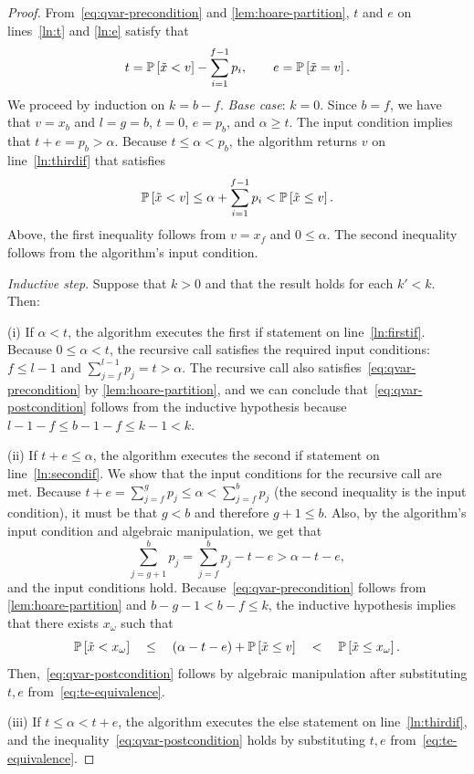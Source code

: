 \begin{proof}
From~\eqref{eq:qvar-precondition} and \cref{lem:hoare-partition}, $t$ and $e$ on lines~\ref{ln:t} and \ref{ln:e} satisfy that
\begin{equation} \label{eq:te-equivalence}
  t = \P{\tilde{x} < v} - \sum_{i=1}^{f-1} p_i , \qquad e = \P{\tilde{x} = v}.
\end{equation}
We proceed by induction on $k = b - f$. \emph{Base case}: $k = 0$. Since $b = f$, we have that $v = x_b$ and $l = g = b$, $t = 0$, $e = p_b$, and $\alpha  \ge t$. The input condition implies that $t + e = p_b > \alpha$. Because $t \le \alpha < p_b$, the algorithm returns $v$ on line~\ref{ln:thirdif} that satisfies
\[
 \P{\tilde{x} < v} \le \alpha + \sum_{i=1}^{f-1} p_i < \P{\tilde{x} \le v}. 
\]
Above, the first inequality follows from $v = x_f$ and $0 \le \alpha$. The second inequality follows from the algorithm's input condition.  

\emph{Inductive step}. Suppose that $k>0$ and that the result holds for each $k' < k$. Then:

(i) If $\alpha < t$, the algorithm executes the first if statement on line~\ref{ln:firstif}. Because $0 \le \alpha  < t$, the recursive call satisfies the required input conditions: $f \le l-1$ and $\sum_{j=f}^{l-1} p_j = t > \alpha$. The recursive call also satisfies~\eqref{eq:qvar-precondition} by \cref{lem:hoare-partition}, and we can conclude that~\eqref{eq:qvar-postcondition} follows from the inductive hypothesis because $l-1 - f \le b-1 -f \le k-1 < k$. 

(ii) If $t + e \le \alpha$, the algorithm executes the second if statement on line~\ref{ln:secondif}. We show that the input conditions for the recursive call are met. Because $t + e = \sum_{j = f}^g p_j \le \alpha < \sum_{j=f}^b p_j$  (the second inequality is the input condition), it must be that $g < b$ and therefore $g+1 \le b$. Also, by the algorithm's input condition and algebraic manipulation, we get that
\[
 \sum_{j=g+1}^b p_j = \sum_{j=f}^b p_j - t - e > \alpha - t - e,
\]
and the input conditions hold.  Because~\eqref{eq:qvar-precondition} follows from \cref{lem:hoare-partition} and $b - g - 1 < b-f \le  k$, the inductive hypothesis implies that there exists $x_{\omega}$ such that
\[
  \P{\tilde{x} < x_{\omega}}
  \quad \le \quad
  (\alpha - t - e) + \P{\tilde{x} \le v}
  \quad < \quad \P{\tilde{x} \le x_{\omega}}. 
\]
Then,~\eqref{eq:qvar-postcondition} follows by algebraic manipulation after substituting $t,e$ from~\eqref{eq:te-equivalence}.

(iii) If $t \le \alpha < t + e$, the algorithm executes the else statement on line~\ref{ln:thirdif}, and the inequality~\eqref{eq:qvar-postcondition} holds by substituting $t,e$ from~\eqref{eq:te-equivalence}.
\end{proof}

